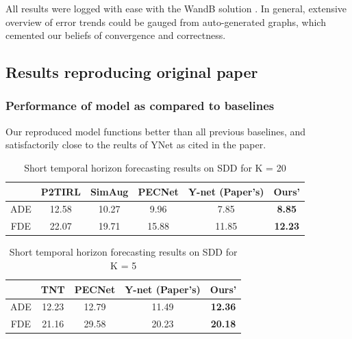 All results were logged with ease with the WandB solution \cite{wandb}. In general, extensive overview of error trends could be gauged from auto-generated graphs, which cemented our beliefs of convergence and correctness.

\subsection{Results reproducing original paper}

\subsubsection{Performance of model as compared to baselines}

Our reproduced model functions better than all previous baselines, and satisfactorily close to the reults of YNet as cited in the paper. 

\begin{table}[H]
\vspace*{-.1in}
\begin{center}
\begin{tabular}{ |c|c|c|c|c|c|}
 \hline
  & P2TIRL\cite{deo2021trajectory}& SimAug\cite{liang2020simaug} & PECNet\cite{mangalam2020journey} & Y-net (Paper's)  & Ours' \\ 
  \hline
 ADE & 12.58 & 10.27 & 9.96 & 7.85 & \textbf{8.85}  \\ 
 \hline
 FDE & 22.07 & 19.71 & 15.88 & 11.85 & \textbf{12.23} \\ 
 \hline

\end{tabular}
\bigskip
\caption{Short temporal horizon forecasting results on SDD for K = 20 }
\label{eq:result_1}
\end{center}
\vspace*{-.1in}
\end{table}

\begin{table}[H]
\vspace*{-.1in}
\begin{center}
\begin{tabular}{ |c|c|c|c|c| }
 \hline
  & TNT\cite{zhao2020tnt} & PECNet\cite{mangalam2020journey}  & Y-net (Paper's) & Ours'  \\ 
  \hline
 ADE & 12.23 & 12.79 & 11.49 & \textbf{12.36}  \\ 
 \hline
 FDE & 21.16 & 29.58 & 20.23 & \textbf{20.18} \\ 
 \hline

\end{tabular}
\bigskip
\caption{Short temporal horizon forecasting results on SDD for K = 5}
\label{eq:result_1}
\end{center}
\vspace*{-.1in}
\end{table}


